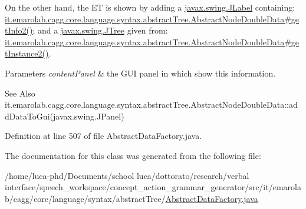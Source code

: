  On the other hand, the E\-T is shown by adding a \hyperlink{}{javax.\-swing.\-J\-Label} containing\-: \hyperlink{}{it.\-emarolab.\-cagg.\-core.\-language.\-syntax.\-abstract\-Tree.\-Abstract\-Node\-Double\-Data\#get\-Info2()}; and a \hyperlink{}{javax.\-swing.\-J\-Tree} given from\-: \hyperlink{}{it.\-emarolab.\-cagg.\-core.\-language.\-syntax.\-abstract\-Tree.\-Abstract\-Node\-Double\-Data\#get\-Instance2()}. 
\begin{DoxyParams}{Parameters}
{\em content\-Panel} & the G\-U\-I panel in which show this information. \\
\hline
\end{DoxyParams}
\begin{DoxySeeAlso}{See Also}
it.\-emarolab.\-cagg.\-core.\-language.\-syntax.\-abstract\-Tree.\-Abstract\-Node\-Double\-Data\-::add\-Data\-To\-Gui(javax.\-swing.\-J\-Panel) 
\end{DoxySeeAlso}


Definition at line 507 of file Abstract\-Data\-Factory.\-java.



The documentation for this class was generated from the following file\-:\begin{DoxyCompactItemize}
\item 
/home/luca-\/phd/\-Documents/school luca/dottorato/research/verbal interface/speech\-\_\-workspace/concept\-\_\-action\-\_\-grammar\-\_\-generator/src/it/emarolab/cagg/core/language/syntax/abstract\-Tree/\hyperlink{AbstractDataFactory_8java}{Abstract\-Data\-Factory.\-java}\end{DoxyCompactItemize}

